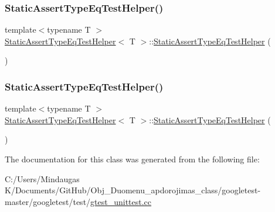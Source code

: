 \mbox{\label{class_static_assert_type_eq_test_helper_a9b567f0542f353d536119dae01e1ee1d}} 
\subsubsection{\texorpdfstring{StaticAssertTypeEqTestHelper()}{StaticAssertTypeEqTestHelper()}\hspace{0.1cm}{\footnotesize\ttfamily [2/3]}}
{\footnotesize\ttfamily template$<$typename T $>$ \\
\mbox{\hyperlink{class_static_assert_type_eq_test_helper}{Static\+Assert\+Type\+Eq\+Test\+Helper}}$<$ T $>$\+::\mbox{\hyperlink{class_static_assert_type_eq_test_helper}{Static\+Assert\+Type\+Eq\+Test\+Helper}} (\begin{DoxyParamCaption}{ }\end{DoxyParamCaption})\hspace{0.3cm}{\ttfamily [inline]}}

\mbox{\label{class_static_assert_type_eq_test_helper_a9b567f0542f353d536119dae01e1ee1d}} 
\subsubsection{\texorpdfstring{StaticAssertTypeEqTestHelper()}{StaticAssertTypeEqTestHelper()}\hspace{0.1cm}{\footnotesize\ttfamily [3/3]}}
{\footnotesize\ttfamily template$<$typename T $>$ \\
\mbox{\hyperlink{class_static_assert_type_eq_test_helper}{Static\+Assert\+Type\+Eq\+Test\+Helper}}$<$ T $>$\+::\mbox{\hyperlink{class_static_assert_type_eq_test_helper}{Static\+Assert\+Type\+Eq\+Test\+Helper}} (\begin{DoxyParamCaption}{ }\end{DoxyParamCaption})\hspace{0.3cm}{\ttfamily [inline]}}



The documentation for this class was generated from the following file\+:\begin{DoxyCompactItemize}
\item 
C\+:/\+Users/\+Mindaugas K/\+Documents/\+Git\+Hub/\+Obj\+\_\+\+Duomenu\+\_\+apdorojimas\+\_\+class/googletest-\/master/googletest/test/\mbox{\hyperlink{googletest-master_2googletest_2test_2gtest__unittest_8cc}{gtest\+\_\+unittest.\+cc}}\end{DoxyCompactItemize}
